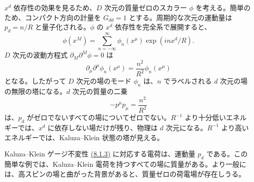 $x^d$ 依存性の効果を見るため、$D$ 次元の質量ゼロのスカラー $\phi$ を考える。簡単のため、コンパクト方向の計量を $G_{dd}=1$ とする。周期的な次元の運動量は $p_d=n/R$ と量子化される。$\phi$ の $x^d$ 依存性を完全系で展開すると、
\begin{equation}
\phi(x^M)=\sum_{n=-\infty}^{\infty}\phi_n(x^\mu)\exp(inx^d/R).
\tag{8.1.5}\label{eq:8.1.5}
\end{equation}
$D$ 次元の波動方程式 $\partial_M\partial^M\phi=0$ は
\begin{equation}
\partial_\mu\partial^\mu\phi_n(x^\mu)=\frac{n^2}{R^2}\phi_n(x^\mu)
\tag{8.1.6}\label{eq:8.1.6}
\end{equation}
となる。したがって $D$ 次元の場のモード $\phi_n$ は、$n$ でラベルされる $d$ 次元の場の無限の塔になる。$d$ 次元の質量の二乗
\begin{equation}
-p^\mu p_\mu=\frac{n^2}{R^2}
\tag{8.1.7}\label{eq:8.1.7}
\end{equation}
は、$p_d$ がゼロでないすべての場についてゼロでない。$R^{-1}$ より十分低いエネルギーでは、$x^d$ に依存しない場だけが残り、物理は $d$ 次元になる。$R^{-1}$ より高いエネルギーでは、Kaluza--Klein 状態の塔が見える。

Kaluza--Klein ゲージ不変性 \hyperref[eq:8.1.3]{(8.1.3)} に対応する電荷は、運動量 $p_d$ である。この簡単な例では、Kaluza--Klein 電荷を持つすべての場に質量がある。より一般には、高スピンの場と曲がった背景があると、質量ゼロの荷電場が存在しうる。

